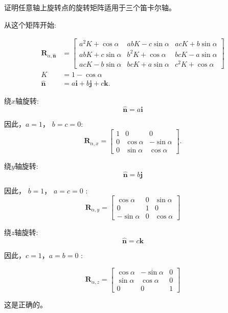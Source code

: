 \begin{example}
    证明任意轴上旋转点的旋转矩阵适用于三个笛卡尔轴。
    
    从这个矩阵开始:
    
    $$
    \begin{aligned}
    \mathbf{R}_{\alpha, \hat{\mathbf{n}}} & =\left[\begin{array}{ccc}
    a^{2} K+\cos \alpha & a b K-c \sin \alpha & a c K+b \sin \alpha \\
    a b K+c \sin \alpha & b^{2} K+\cos \alpha & b c K-a \sin \alpha \\
    a c K-b \sin \alpha & b c K+a \sin \alpha & c^{2} K+\cos \alpha
    \end{array}\right] \\
    K & =1-\cos \alpha \\
    \hat{\mathbf{n}} & =a \mathbf{i}+b \mathbf{j}+c \mathbf{k} .
    \end{aligned}
    $$
    
    绕$x$轴旋转:
    $$
    \hat{\mathbf{n}}=a \mathbf{i}
    $$
    
    因此，$a=1$， $b=c=0$:
    $$
    \mathbf{R}_{\alpha, x}=\left[\begin{array}{ccc}
    1 & 0 & 0 \\
    0 & \cos \alpha & -\sin \alpha \\
    0 & \sin \alpha & \cos \alpha
    \end{array}\right] .
    $$
    
    绕$y$轴旋转:
    $$
    \hat{\mathbf{n}}=b \mathbf{j}
    $$
    
    因此， $b=1$， $a=c=0$ :
    $$
    \mathbf{R}_{\alpha, y}=\left[\begin{array}{ccc}
    \cos \alpha & 0 & \sin \alpha \\
    0 & 1 & 0 \\
    -\sin \alpha & 0 & \cos \alpha
    \end{array}\right]
    $$
    
    绕$z$轴旋转:
    $$
    \hat{\mathbf{n}}=c \mathbf{k}
    $$
    
    因此，$c=1$，$a=b=0$ :
    
    $$
    \mathbf{R}_{\alpha, z}=\left[\begin{array}{ccc}
    \cos \alpha & -\sin \alpha & 0 \\
    \sin \alpha & \cos \alpha & 0 \\
    0 & 0 & 1
    \end{array}\right]
    $$
    
    这是正确的。
\end{example}

